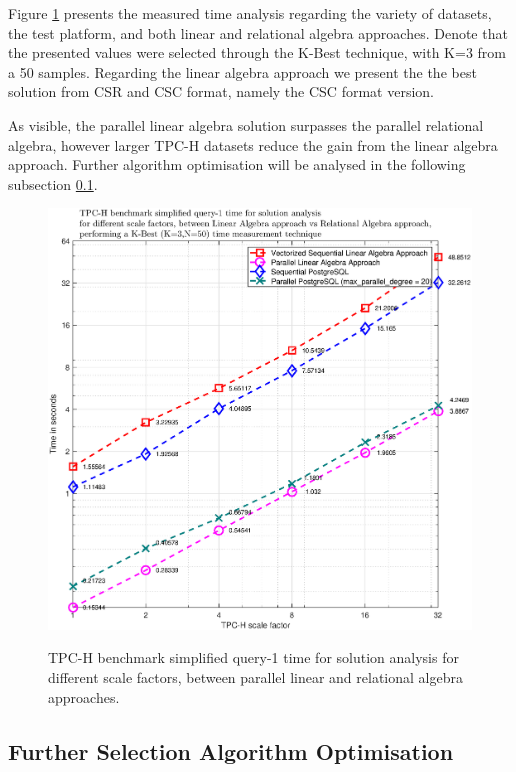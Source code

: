 Figure \ref{fig:time_la_vs_ra_parallel} presents the measured time analysis regarding the variety of datasets, the test platform, and both linear and relational algebra approaches. Denote that the presented values were selected through the K-Best technique, with K=3 from a 50 samples. Regarding the linear algebra approach we present the the best solution from CSR and CSC format, namely the CSC format version.\par
As visible, the parallel linear algebra solution surpasses the parallel relational algebra, however larger TPC-H datasets reduce the gain from the linear algebra approach. Further algorithm optimisation will be analysed in the following subsection \ref{optimization_selection}.\par 

\begin{figure}[H]
\centering
\caption{TPC-H benchmark simplified query-1 time for solution analysis for different scale factors, between parallel linear and relational algebra approaches.}
\includegraphics[width=1\columnwidth]{eps/TIME_LA_vs_RA_parallel.eps}
\label{fig:time_la_vs_ra_parallel}
\end{figure}

\subsection{Further Selection Algorithm Optimisation}
\label{optimization_selection}

